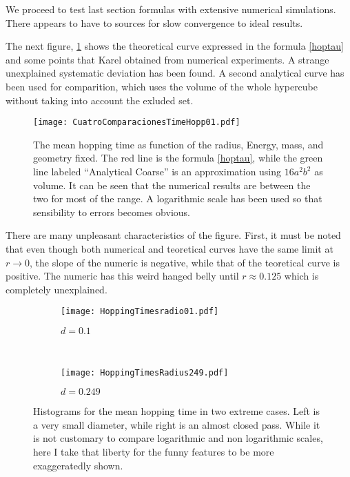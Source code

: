 \documentclass[a4paper,10pt, jcp, aps, preprint]{revtex4-1}
\begin{document}
We proceed to test last section formulas with
extensive numerical simulations. There appears to have to
sources for slow convergence to ideal results.

The next figure, \ref{MeanHopp01} shows the theoretical curve 
expressed in the formula \ref{hoptau} and some points
that Karel obtained from numerical experiments. A strange unexplained
systematic
deviation has been found. A second analytical curve
has been used for comparition, which uses the volume of the
whole hypercube without taking into account the exluded
set. 

\begin{figure}[h]
  \centering
  \texttt{[image: CuatroComparacionesTimeHopp01.pdf]}
  \caption{The mean hopping time as function of the radius, Energy, mass, 
and geometry fixed.
The red line is the formula \ref{hoptau}, while the green line
labeled ``Analytical Coarse'' is an approximation using
 $16a^2b^2$ as volume. It can be seen that the numerical results
are between the two for most of the range.
A logarithmic scale
has been used so that sensibility to errors becomes obvious.}\label{MeanHopp01}
\end{figure}

There are many unpleasant characteristics of the figure. First, it must be
noted that even though both numerical and teoretical curves have the
same limit at $r\rightarrow 0$, the slope of the numeric is negative, while 
that of the teoretical curve is positive. The numeric has this weird 
hanged belly until $r\approx 0.125$ which is completely unexplained.

\begin{figure}[h]
        \centering
        \begin{subfigure}[b]{0.45\textwidth}
                \centering
                \texttt{[image: HoppingTimesradio01.pdf]}
                \caption{$d=0.1$}
                \label{smallradius}
        \end{subfigure}%
        ~ %
        \begin{subfigure}[b]{0.45\textwidth}
                \centering
                \texttt{[image: HoppingTimesRadius249.pdf]}
                \caption{$d=0.249$}
                \label{bigradius}
        \end{subfigure}       
        \caption{Histograms for the mean hopping time
in two extreme cases. Left is a very small diameter, while right is an almost
closed pass. While it is not customary to compare logarithmic and non
logarithmic scales, here I take that liberty for the funny features to be
more exaggeratedly shown.}\label{histohopps}
\end{figure}
\end{document}
